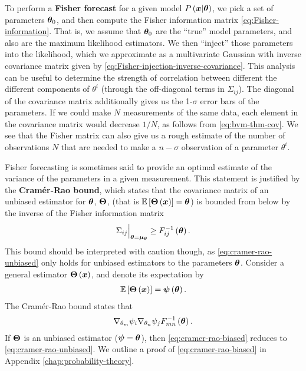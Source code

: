 To perform a \textbf{Fisher forecast} for a given model $P\left({\bm x}|{\bm \theta}\right)$, 
we pick a set of parameters ${\bm \theta}_0$, and then compute the Fisher information matrix
\eqref{eq:Fisher-information}.
That is, we assume that ${\bm \theta}_0$ are the ``true'' model parameters, 
and also are the maximum likelihood estimators.
We then ``inject'' those parameters into the likelihood, which we approximate as a
multivariate Gaussian with inverse covariance matrix given by 
\eqref{eq:Fisher-injection-inverse-covariance}.
This analysis can be useful to determine the strength of correlation between different
the different components of $\theta^i$ (through the off-diagonal terms in $\Sigma_{ij}$).
The diagonal of the covariance matrix additionally gives us the 1-$\sigma$
error bars of the parameters.
If we could make $N$ measurements of the same data, each element in the
covariance matrix would decrease $1/N$, as follows from \eqref{eq:bvm-thm-cov}.
We see that the Fisher matrix can also give us a rough estimate of the number
of observations $N$ that are needed to make a $n-\sigma$ observation of
a parameter $\theta^i$.

Fisher forecasting is sometimes said to provide an optimal estimate of the
variance of the parameters in a given measurement.
This statement is justified by the \textbf{Cram\'{e}r-Rao bound}, which states
that the covariance matrix of an unbiased estimator for ${\bm \theta}$, ${\bm \Theta}$, 
(that is $\mathbb{E}\left[{\bm \Theta}\left({\bm x}\right)\right]={\bm \theta}$)
is bounded from below by the inverse of the Fisher information matrix
\begin{align}
    \label{eq:cramer-rao-unbiased}
    \Sigma_{ij}\Big|_{{\bm \theta}={\bm \mu}_{{\bm \theta}}} 
    \geq 
    F_{ij}^{-1}\left({\bm \theta}\right)
    .
\end{align}
This bound should be interpreted with caution though, as \eqref{eq:cramer-rao-unbiased}
only holds for unbiased estimators to the parameters ${\bm \theta}$.
Consider a general estimator ${\bm \Theta}\left({\bm x}\right)$, and denote its expectation by
\begin{align}
    \mathbb{E}\left[{\bm \Theta}\left({\bm x}\right)\right]
    =
    {\bm \psi}\left({\bm \theta}\right)
    .
\end{align}
The Cram\'{e}r-Rao bound states that
\begin{align}
    \label{eq:cramer-rao-biased}
    \nabla_{\theta_m}\psi_i
    \nabla_{\theta_n}\psi_j
    F_{mn}^{-1}\left({\bm \theta}\right) 
    .
\end{align}
If ${\bm \Theta}$ is an unbiased estimator (${\bm \psi}={\bm \theta}$), then
\eqref{eq:cramer-rao-biased} reduces to \eqref{eq:cramer-rao-unbiased}.
We outline a proof of \eqref{eq:cramer-rao-biased} in Appendix \ref{chap:probability-theory}.
